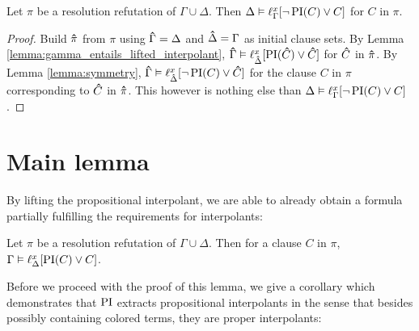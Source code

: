 \begin{corr}
	\label{cor:delta_entails_lifted_interpolant}
	Let $\pi$ be a resolution refutation of $\Gamma \cup \Delta$. 
	Then $\Delta \vDash \ell_{\Gamma}^{x}[ \lnot \operatorname{PI}(C) \lor C ]$ for $C$ in $\pi$.
\end{corr}
\begin{proof}
	Build $\bm\hat{\pi}$ from $\pi$ using $\bm\hat{\Gamma} = \Delta$ and $\bm\hat{\Delta} = \Gamma$ as initial clause sets.
	By Lemma \ref{lemma:gamma_entails_lifted_interpolant}, $\bm\hat{\Gamma} \vDash \ell_{\bm\hat{\Delta}}^{x}[ \operatorname{PI}(\bm\hat{C}) \lor \bm\hat{C} ]$ for $\bm\hat{C}$ in $\bm\hat{\pi}$. 
	By Lemma \ref{lemma:symmetry},
	$\bm\hat{\Gamma} \vDash \ell_{\bm\hat{\Delta}}^{x}[ \lnot \operatorname{PI}(C) \lor \bm\hat{C} ]$ for the clause $C$ in $\pi$ corresponding to $\bm\hat{C}$ in $\bm\hat{\pi}$. 
	This however is nothing else than 
	$\Delta \entails\nolinebreak \lft{\Gamma}{x}{ \lnot \PI(C) \lor C }$.
\end{proof}

\section{Main lemma}

By lifting the propositional interpolant, we are able to already obtain a formula partially fulfilling the requirements for interpolants:



\begin{lemma}
	Let $\pi$ be a resolution refutation of $\Gamma \cup \Delta$.
	Then for a clause $C$ in $\pi$,
	$ \Gamma \entails \lifdelta{\PI(C) \lor\nolinebreak C} $.
	\label{lemma:gamma_entails_lifted_interpolant}
\end{lemma}

Before we proceed with the proof of this lemma, we give a corollary which demonstrates that $\operatorname{PI}$ 
extracts propositional interpolants in the sense that besides possibly containing colored terms, they are proper interpolants:

